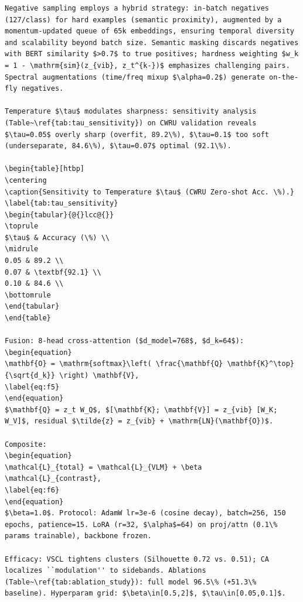 \begin{verbatim}
Negative sampling employs a hybrid strategy: in-batch negatives (127/class) for hard examples (semantic proximity), augmented by a momentum-updated queue of 65k embeddings, ensuring temporal diversity and scalability beyond batch size. Semantic masking discards negatives with BERT similarity $>0.7$ to true positives; hardness weighting $w_k = 1 - \mathrm{sim}(z_{vib}, z_t^{k-})$ emphasizes challenging pairs. Spectral augmentations (time/freq mixup $\alpha=0.2$) generate on-the-fly negatives.

Temperature $\tau$ modulates sharpness: sensitivity analysis (Table~\ref{tab:tau_sensitivity}) on CWRU validation reveals $\tau=0.05$ overly sharp (overfit, 89.2\%), $\tau=0.1$ too soft (underseparate, 84.6\%), $\tau=0.07$ optimal (92.1\%). 

\begin{table}[htbp]
\centering
\caption{Sensitivity to Temperature $\tau$ (CWRU Zero-shot Acc. \%).}
\label{tab:tau_sensitivity}
\begin{tabular}{@{}lcc@{}}
\toprule
$\tau$ & Accuracy (\%) \\
\midrule
0.05 & 89.2 \\
0.07 & \textbf{92.1} \\
0.10 & 84.6 \\
\bottomrule
\end{tabular}
\end{table}

Fusion: 8-head cross-attention ($d_model=768$, $d_k=64$):
\begin{equation}
\mathbf{O} = \mathrm{softmax}\left( \frac{\mathbf{Q} \mathbf{K}^\top}{\sqrt{d_k}} \right) \mathbf{V},
\label{eq:f5}
\end{equation}
$\mathbf{Q} = z_t W_Q$, $[\mathbf{K}; \mathbf{V}] = z_{vib} [W_K; W_V]$, residual $\tilde{z} = z_{vib} + \mathrm{LN}(\mathbf{O})$.

Composite:
\begin{equation}
\mathcal{L}_{total} = \mathcal{L}_{VLM} + \beta \mathcal{L}_{contrast},
\label{eq:f6}
\end{equation}
$\beta=1.0$. Protocol: AdamW lr=3e-6 (cosine decay), batch=256, 150 epochs, patience=15. LoRA (r=32, $\alpha$=64) on proj/attn (0.1\% params trainable), backbone frozen.

Efficacy: VSCL tightens clusters (Silhouette 0.72 vs. 0.51); CA localizes ``modulation'' to sidebands. Ablations (Table~\ref{tab:ablation_study}): full model 96.5\% (+51.3\% baseline). Hyperparam grid: $\beta\in[0.5,2]$, $\tau\in[0.05,0.1]$.


\end{verbatim}
